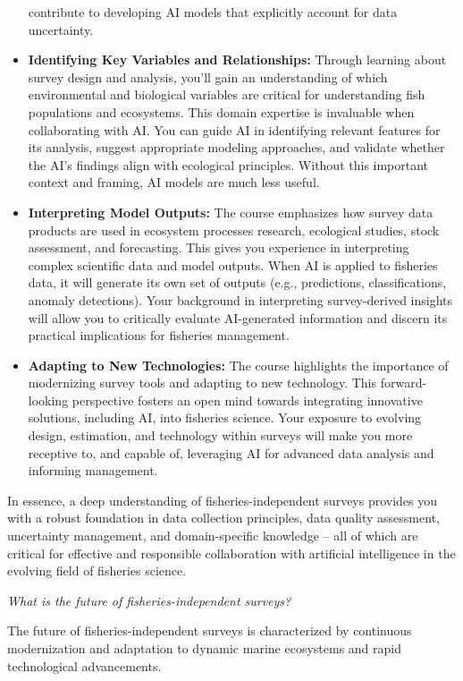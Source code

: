 \documentclass[
  letterpaper,
  oneside,
  open=any]{scrbook}
\begin{document}
\begin{itemize}
  contribute to developing AI models that explicitly account for data
  uncertainty.
\item
  \textbf{Identifying Key Variables and Relationships:} Through learning
  about survey design and analysis, you'll gain an understanding of
  which environmental and biological variables are critical for
  understanding fish populations and ecosystems. This domain expertise
  is invaluable when collaborating with AI. You can guide AI in
  identifying relevant features for its analysis, suggest appropriate
  modeling approaches, and validate whether the AI's findings align with
  ecological principles. Without this important context and framing, AI
  models are much less useful.
\item
  \textbf{Interpreting Model Outputs:} The course emphasizes how survey
  data products are used in ecosystem processes research, ecological
  studies, stock assessment, and forecasting. This gives you experience
  in interpreting complex scientific data and model outputs. When AI is
  applied to fisheries data, it will generate its own set of outputs
  (e.g., predictions, classifications, anomaly detections). Your
  background in interpreting survey-derived insights will allow you to
  critically evaluate AI-generated information and discern its practical
  implications for fisheries management.
\item
  \textbf{Adapting to New Technologies:} The course highlights the
  importance of modernizing survey tools and adapting to new technology.
  This forward-looking perspective fosters an open mind towards
  integrating innovative solutions, including AI, into fisheries
  science. Your exposure to evolving design, estimation, and technology
  within surveys will make you more receptive to, and capable of,
  leveraging AI for advanced data analysis and informing management.
\end{itemize}

In essence, a deep understanding of fisheries-independent surveys
provides you with a robust foundation in data collection principles,
data quality assessment, uncertainty management, and domain-specific
knowledge -- all of which are critical for effective and responsible
collaboration with artificial intelligence in the evolving field of
fisheries science.

\emph{What is the future of fisheries-independent surveys?}

The future of fisheries-independent surveys is characterized by
continuous modernization and adaptation to dynamic marine ecosystems and
rapid technological advancements.
\end{document}
